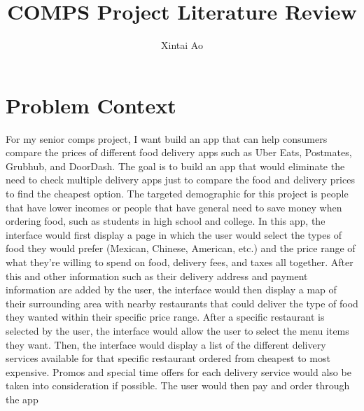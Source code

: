 \documentclass[10pt,twocolumn,letterpaper]{article}
\begin{document}

\title{COMPS Project Literature Review}

\author{Xintai Ao}
\maketitle

\section{Problem Context}
\label{sec:Problem Context}

For my senior comps project, I want build an app that can help consumers compare the prices of different food delivery apps such as Uber Eats, Postmates, Grubhub, and DoorDash. The goal is to build an app that would eliminate the need to check multiple delivery apps just to compare the food and delivery prices to find the cheapest option. The targeted demographic for this project is people that have lower incomes or people that have general need to save money when ordering food, such as students in high school and college. In this app, the interface would first display a page in which the user would select the types of food they would prefer (Mexican, Chinese, American, etc.) and the price range of what they’re willing to spend on food, delivery fees, and taxes all together. After this and other information such as their delivery address and payment information are added by the user, the interface would then display a map of their surrounding area with nearby restaurants that could deliver the type of food they wanted within their specific price range. After a specific restaurant is selected by the user, the interface would allow the user to select the menu items they want. Then, the interface would display a list of the different delivery services available for that specific restaurant ordered from cheapest to most expensive. Promos and special time offers for each delivery service would also be taken into consideration if possible. The user would then pay and order through the app
\end{document}
